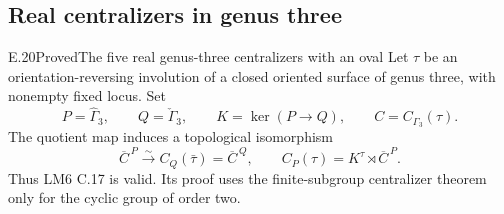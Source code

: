 \subsection{Real centralizers in genus three}
\begin{result}{E.20}{Proved}{The five real genus-three centralizers with an oval}
Let $\tau$ be an orientation-reversing involution of a closed
oriented surface of genus three, with nonempty fixed locus.  Set
\[
 P=\widehat\Gamma_3,\qquad Q=\check\Gamma_3,\qquad
 K=\ker(P\longrightarrow Q),\qquad C=C_{\Gamma_3}(\tau).
\]
The quotient map induces a topological isomorphism
\[
 \overline C^{\,P}\xrightarrow{\sim}
 C_Q(\bar\tau)=\overline C^{\,Q},\qquad
 C_P(\tau)=K^\tau\rtimes\overline C^{\,P}.                    \tag{E.41}
\]
Thus LM6 C.17 is valid.  Its proof uses the finite-subgroup
centralizer theorem only for the cyclic group of order two.
\end{result}

